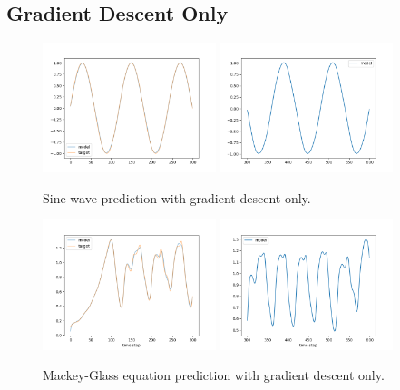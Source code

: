 \documentclass[12pt, a4paper]{article}
\begin{document}
\subsection*{Gradient Descent Only}

\begin{figure}[H]
    \centering
    \includegraphics[width=0.45\textwidth]{fig/sin_train.png}
    \includegraphics[width=0.45\textwidth]{fig/sin_pred.png}
    \caption{Sine wave prediction with gradient descent only.}
    \label{fig:1}
\end{figure}

\begin{figure}[H]
    \centering
    \includegraphics[width=0.45\textwidth]{fig/MG_train.png}
    \includegraphics[width=0.45\textwidth]{fig/MG_pred.png}
    \caption{Mackey-Glass equation prediction with gradient descent only.}
    \label{fig:2}
\end{figure}
\end{document}
